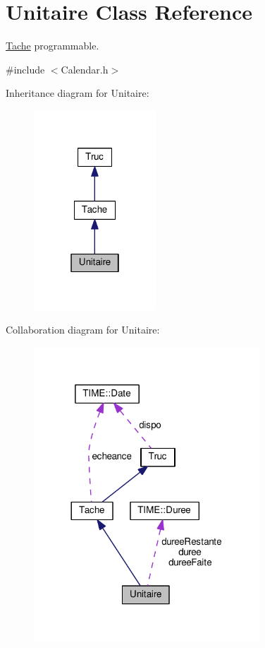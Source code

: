 \hypertarget{class_unitaire}{}\section{Unitaire Class Reference}
\label{class_unitaire}


\hyperlink{class_tache}{Tache} programmable.  




{\ttfamily \#include $<$Calendar.\+h$>$}



Inheritance diagram for Unitaire\+:\nopagebreak
\begin{figure}[H]
\begin{center}
\leavevmode
\includegraphics[width=130pt]{class_unitaire__inherit__graph}
\end{center}
\end{figure}


Collaboration diagram for Unitaire\+:\nopagebreak
\begin{figure}[H]
\begin{center}
\leavevmode
\includegraphics[width=240pt]{class_unitaire__coll__graph}
\end{center}
\end{figure}
